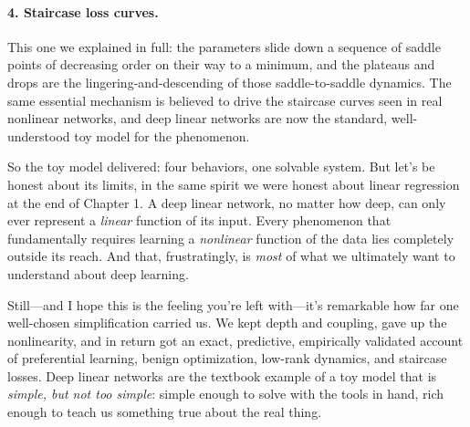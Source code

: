 \paragraph{4. Staircase loss curves.} This one we explained in full: the
parameters slide down a sequence of saddle points of decreasing order on their way
to a minimum, and the plateaus and drops are the lingering-and-descending of those
saddle-to-saddle dynamics. The same essential mechanism is believed to drive the
staircase curves seen in real nonlinear networks, and deep linear networks are now
the standard, well-understood toy model for the phenomenon.

\bigskip

So the toy model delivered: four behaviors, one solvable system. But let's be
honest about its limits, in the same spirit we were honest about linear regression
at the end of Chapter 1. A deep linear network, no matter how deep, can only ever
represent a \emph{linear} function of its input. Every phenomenon that
fundamentally requires learning a \emph{nonlinear} function of the data lies
completely outside its reach. And that, frustratingly, is \emph{most} of what we
ultimately want to understand about deep learning.

Still---and I hope this is the feeling you're left with---it's remarkable how far
one well-chosen simplification carried us. We kept depth and coupling, gave up the
nonlinearity, and in return got an exact, predictive, empirically validated
account of preferential learning, benign optimization, low-rank dynamics, and
staircase losses. Deep linear networks are the textbook example of a toy model
that is \emph{simple, but not too simple}: simple enough to solve with the tools in
hand, rich enough to teach us something true about the real thing.